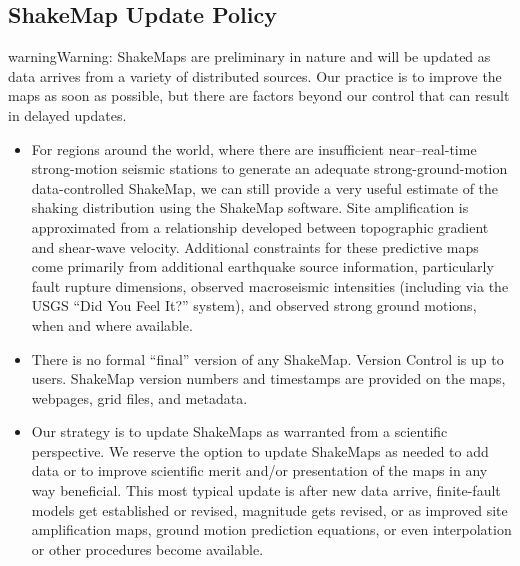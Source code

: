\documentclass[letterpaper,10pt,english]{sphinxmanual}
\begin{document}
\subsection{ShakeMap Update Policy}
\label{disclaimers:shakemap-update-policy}
\begin{notice}{warning}{Warning:}
ShakeMaps are preliminary in nature and will be updated as data arrives from a variety of distributed sources. Our practice is to improve the maps as soon as possible, but there are factors beyond our control that can result in delayed updates.
\end{notice}
\begin{itemize}
\item {} 
For regions around the world, where there are insufficient near--real-time
strong-motion seismic stations to generate an adequate strong-ground-motion
data-controlled ShakeMap, we can still provide a very useful estimate of the
shaking distribution using the ShakeMap software. Site amplification is
approximated from a relationship developed between topographic gradient and
shear-wave velocity. Additional constraints for these predictive maps come
primarily from  additional earthquake source information, particularly fault
rupture dimensions, observed macroseismic intensities (including via the USGS
``Did You Feel It?'' system), and observed strong ground motions, when and where
available.

\item {} 
There is no formal “final” version of any ShakeMap. Version Control is up to
users. ShakeMap version numbers and timestamps are provided on the maps,
webpages, grid files, and metadata.

\item {} 
Our strategy is to update ShakeMaps as warranted from a scientific
perspective. We reserve the option to update ShakeMaps as needed to add data
or to improve scientific merit and/or presentation of the maps in any way
beneficial. This most typical update is after new data arrive, finite-fault
models get established or revised, magnitude gets revised, or as improved site
amplification maps, ground motion prediction equations, or even interpolation
or other procedures become available.

\end{itemize}
\end{document}
